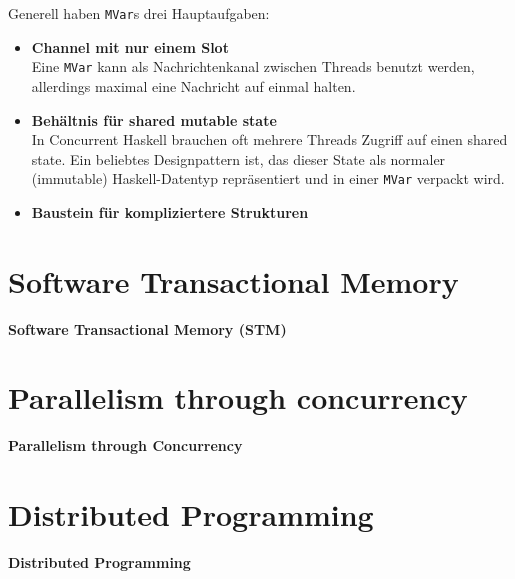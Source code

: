 \documentclass{beamer}
\begin{document}

\begin{frame}
Generell haben \texttt{MVar}s drei Hauptaufgaben:\pause

\begin{itemize}
\item \textbf{Channel mit nur einem Slot}\\
Eine \texttt{MVar} kann als Nachrichtenkanal zwischen Threads benutzt werden, allerdings maximal eine Nachricht auf einmal halten.\pause

\item \textbf{Behältnis für shared mutable state}\\
In Concurrent Haskell brauchen oft mehrere Threads Zugriff auf einen shared state. Ein beliebtes Designpattern ist, das dieser State als normaler (immutable) Haskell-Datentyp repräsentiert und in einer \texttt{MVar} verpackt wird.\pause

\item \textbf{Baustein für kompliziertere Strukturen}
\end{itemize}
\end{frame}


\section{Software Transactional Memory}

\begin{frame}

\begin{center}
\Large
\textbf{Software Transactional Memory (STM)}
\end{center}

\end{frame}


\section{Parallelism through concurrency}

\begin{frame}

\begin{center}
\Large
\textbf{Parallelism through Concurrency}
\end{center}

\end{frame}


\section{Distributed Programming}

\begin{frame}

\begin{center}
\Large
\textbf{Distributed Programming}
\end{center}

\end{frame}
\end{document}
